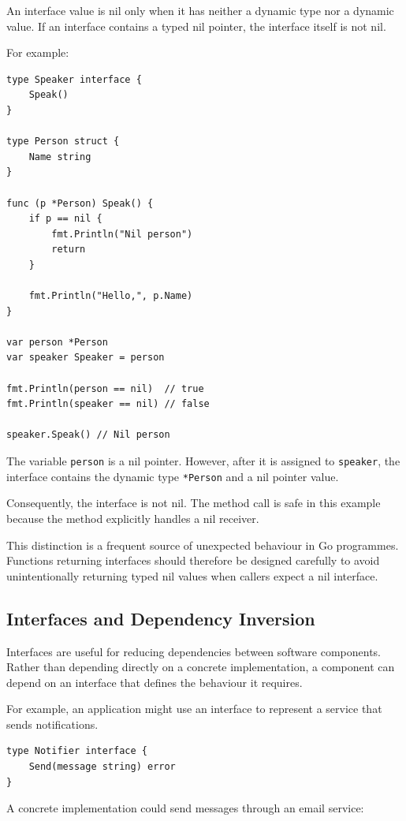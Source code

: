 An interface value is nil only when it has neither a dynamic type nor a dynamic value. If an interface contains a typed nil pointer, the interface itself is not nil.

For example:

\begin{lstlisting}
type Speaker interface {
    Speak()
}

type Person struct {
    Name string
}

func (p *Person) Speak() {
    if p == nil {
        fmt.Println("Nil person")
        return
    }

    fmt.Println("Hello,", p.Name)
}

var person *Person
var speaker Speaker = person

fmt.Println(person == nil)  // true
fmt.Println(speaker == nil) // false

speaker.Speak() // Nil person
\end{lstlisting}

The variable \texttt{person} is a nil pointer. However, after it is assigned to \texttt{speaker}, the interface contains the dynamic type \texttt{*Person} and a nil pointer value.

Consequently, the interface is not nil. The method call is safe in this example because the method explicitly handles a nil receiver.

This distinction is a frequent source of unexpected behaviour in Go programmes. Functions returning interfaces should therefore be designed carefully to avoid unintentionally returning typed nil values when callers expect a nil interface.

\subsection{Interfaces and Dependency Inversion}

Interfaces are useful for reducing dependencies between software components. Rather than depending directly on a concrete implementation, a component can depend on an interface that defines the behaviour it requires.

For example, an application might use an interface to represent a service that sends notifications.

\begin{lstlisting}
type Notifier interface {
    Send(message string) error
}
\end{lstlisting}

A concrete implementation could send messages through an email service:

